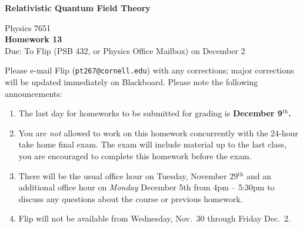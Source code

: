 \documentclass[12pt]{article}
\begin{document}
\vspace*{-1cm}
\begin{center}
{\LARGE \bf Relativistic Quantum Field Theory}

\vspace*{0.5cm}
{\Large Physics 7651} \\
\vspace*{0.5cm}
{\Large {\bf Homework 13}\\
\vspace*{0.5cm}
Due: To Flip (PSB 432, or Physics Office Mailbox) on December 2}
\end{center}

\begin{framed}
\noindent Please e-mail Flip (\texttt{pt267@cornell.edu}) with any corrections; major corrections will be updated immediately on Blackboard. Please note the following announcements:
\begin{enumerate}
	\item The last day for homeworks to be submitted for grading is \textbf{December 9$^\text{th}$.}
	\item You are \textit{not} allowed to work on this homework concurrently with the 24-hour take home final exam. The exam will include material up to the last class, you are encouraged to complete this homework before the exam.
	\item There will be the usual office hour on Tuesday, November 29$^\text{th}$ and an additional office hour on \textit{Monday} December 5th from 4pm -- 5:30pm to discuss any questions about the course or previous homework.
	\item Flip will not be available from Wednesday, Nov.~30 through Friday Dec.~2.
\end{enumerate}
\end{framed}
\end{document}
